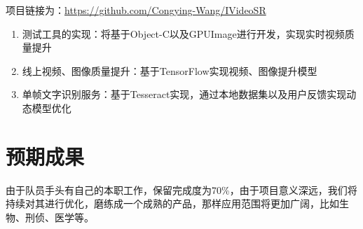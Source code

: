 \documentclass[UTF8]{ctexart}
\begin{document}
项目链接为：\url{https://github.com/Congying-Wang/IVideoSR}
\begin{enumerate}
	\item 测试工具的实现：将基于Object-C以及GPUImage进行开发，实现实时视频质量提升
	\item 线上视频、图像质量提升：基于TensorFlow实现视频、图像提升模型
	\item 单帧文字识别服务：基于Tesseract实现，通过本地数据集以及用户反馈实现动态模型优化
\end{enumerate}
\section{预期成果}
由于队员手头有自己的本职工作，保留完成度为70\%，由于项目意义深远，我们将持续对其进行优化，磨练成一个成熟的产品，那样应用范围将更加广阔，比如生物、刑侦、医学等。
\end{document}
